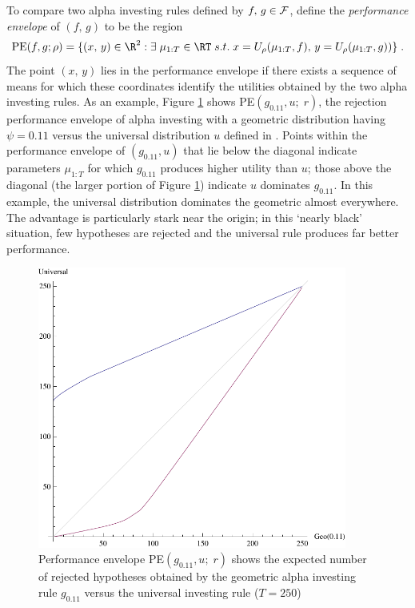 \documentclass[12pt]{article}
\begin{document}
 To compare two alpha investing rules defined by $f,\,g \in {\cal F}$, define
 the {\em performance envelope} of $(f,\,g)$ to be the region
 \begin{equation}
    \mbox{PE}(f,g;\rho) = \{(x,\,y) \in \R^2: \exists \; \mu_{1:T} \in \RT \; s.t. \; 
                     x = U_\rho(\mu_{1:T},f),\,  y=U_\rho(\mu_{1:T},g))\} \;.
 \label{eq:PE}
 \end{equation}
 The point $(x,\,y)$ lies in the performance envelope if there exists a sequence
 of means for which these coordinates identify the utilities obtained by the two
 alpha investing rules.  As an example, Figure \ref{fi:pe} shows PE$(g_{0.11},u;\;
 r)$, the rejection performance envelope of alpha investing with a geometric
 distribution having $\psi = 0.11$ versus the universal distribution $u$ defined
 in .  Points within the performance envelope of $(g_{0.11},u)$ that lie
 below the diagonal indicate parameters $\mu_{1:T}$ for which $g_{0.11}$ produces
 higher utility than $u$; those above the diagonal (the larger portion of Figure
 \ref{fi:pe}) indicate $u$ dominates $g_{0.11}$. In this example, the universal
 distribution dominates the geometric almost everywhere.  The advantage is
 particularly stark near the origin; in this `nearly black' situation, few
 hypotheses are rejected and the universal rule produces far better performance.


 \begin{figure}
 \caption{ \label{fi:pe} Performance envelope PE$(g_{0.11},u;\;r)$ shows the
 expected number of rejected hypotheses obtained by the geometric alpha
 investing rule $g_{0.11}$ versus the universal investing rule ($T=250$)}
 \centerline{ \includegraphics[width=4in]{envelope} }
 \end{figure}
\end{document}
